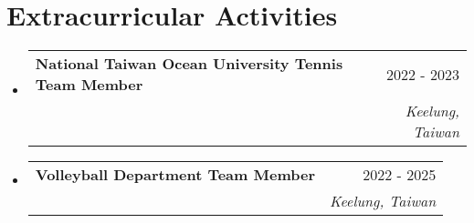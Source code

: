 \documentclass[letterpaper,11pt]{article}
\makeatletter
\newcommand{\resumeSubheading}[4]{
  \vspace{-2pt}\item
    \begin{tabular*}{0.97\textwidth}[t]{l@{\extracolsep{\fill}}r}
      \textbf{#1} & #2 \\
      \textit{\small#3} & \textit{\small #4} \\
    \end{tabular*}\vspace{-7pt}
}
\newcommand{\resumeSubHeadingListStart}{\begin{itemize}[leftmargin=0.15in, label={}]}
\newcommand{\resumeSubHeadingListEnd}{\end{itemize}}
\makeatother
\begin{document}
\section{Extracurricular Activities}
    \resumeSubHeadingListStart
      \resumeSubheading
        {National Taiwan Ocean University Tennis Team Member}{2022 - 2023}{}{Keelung, Taiwan}
      \resumeSubheading
        {Volleyball Department Team Member}{2022 - 2025}{}{Keelung, Taiwan}
    \resumeSubHeadingListEnd
\end{document}
